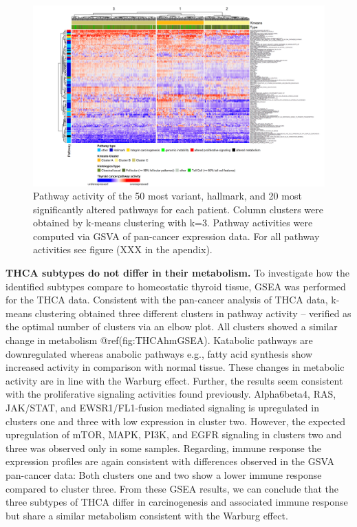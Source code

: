 \documentclass[
]{article}
\begin{document}
\begin{figure}

{\centering \includegraphics[width=1\linewidth]{figures/THCA Heatmap from Pancancer data top 50 pathways} 

}

\caption{Pathway activity of the 50 most variant, hallmark, and 20 most significantly altered pathways for each patient. Column clusters were obtained by k-means clustering with k=3. Pathway activities were computed via GSVA of pan-cancer expression data. For all pathway activities see figure (XXX in the apendix).}\label{fig:THCAhm}
\end{figure}

\textbf{THCA subtypes do not differ in their metabolism.} To investigate
how the identified subtypes compare to homeostatic thyroid tissue, GSEA
was performed for the THCA data. Consistent with the pan-cancer analysis
of THCA data, k-means clustering obtained three different clusters in
pathway activity -- verified as the optimal number of clusters via an
elbow plot. All clusters showed a similar change in metabolism
@ref(fig:THCAhmGSEA). Katabolic pathways are downregulated whereas
anabolic pathways e.g., fatty acid synthesis show increased activity in
comparison with normal tissue. These changes in metabolic activity are
in line with the Warburg effect. Further, the results seem consistent
with the proliferative signaling activities found previously.
Alpha6beta4, RAS, JAK/STAT, and EWSR1/FL1-fusion mediated signaling is
upregulated in clusters one and three with low expression in cluster
two. However, the expected upregulation of mTOR, MAPK, PI3K, and EGFR
signaling in clusters two and three was observed only in some samples.
Regarding, immune response the expression profiles are again consistent
with differences observed in the GSVA pan-cancer data: Both clusters one
and two show a lower immune response compared to cluster three. From
these GSEA results, we can conclude that the three subtypes of THCA
differ in carcinogenesis and associated immune response but share a
similar metabolism consistent with the Warburg effect.
\end{document}
